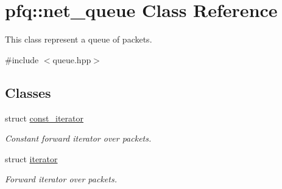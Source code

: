 \hypertarget{classpfq_1_1net__queue}{}\section{pfq\+:\+:net\+\_\+queue Class Reference}
\label{classpfq_1_1net__queue}


This class represent a queue of packets.  




{\ttfamily \#include $<$queue.\+hpp$>$}

\subsection*{Classes}
\begin{DoxyCompactItemize}
\item 
struct \hyperlink{structpfq_1_1net__queue_1_1const__iterator}{const\+\_\+iterator}
\begin{DoxyCompactList}\small\item\em Constant forward iterator over packets. \end{DoxyCompactList}\item 
struct \hyperlink{structpfq_1_1net__queue_1_1iterator}{iterator}
\begin{DoxyCompactList}\small\item\em Forward iterator over packets. \end{DoxyCompactList}\end{DoxyCompactItemize}
